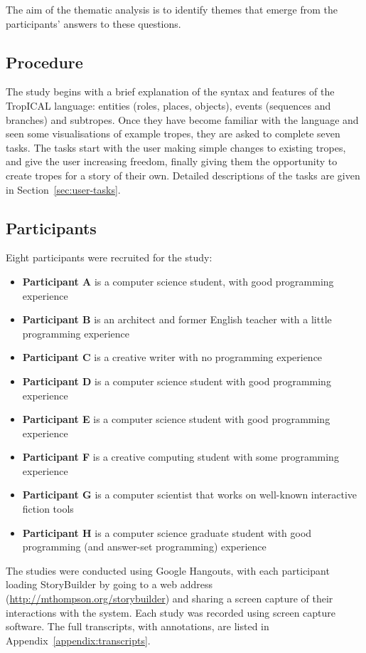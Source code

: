\documentclass[11pt]{report}
\begin{document}
The aim of the thematic analysis is to identify themes that emerge from the participants' answers to these questions.

\subsection{Procedure}

The study begins with a brief explanation of the syntax and features of the
TropICAL language: entities (roles, places, objects), events (sequences and
branches) and subtropes. Once they have become familiar with the language and
seen some visualisations of example tropes, they are asked to complete seven
tasks. The tasks start with the user making simple changes to existing tropes,
and give the user increasing freedom, finally giving them the opportunity to
create tropes for a story of their own. Detailed descriptions of the tasks are
given in Section~\ref{sec:user-tasks}.

\subsection{Participants}
Eight participants were recruited for the study:

\begin{itemize}
\item \textbf{Participant A} is a computer science student,
with good programming experience
\item \textbf{Participant B} is an architect and former English teacher with a little programming experience
\item \textbf{Participant C} is a creative writer with no programming experience
\item \textbf{Participant D} is a computer science student with good programming experience
\item \textbf{Participant E} is a computer science student with good programming experience
\item \textbf{Participant F} is a creative computing student with some programming experience
\item \textbf{Participant G} is a computer scientist that works on well-known
interactive fiction tools
\item \textbf{Participant H} is a computer science graduate student with good
programming (and answer-set programming) experience
\end{itemize}

The studies were conducted using Google Hangouts, with each participant loading
StoryBuilder by going to a web address
(\url{http://mthompson.org/storybuilder}) and sharing a screen capture of their
interactions with the system. Each study was recorded using screen capture
software. The full transcripts, with annotations, are listed in
Appendix~\ref{appendix:transcripts}.
\end{document}
